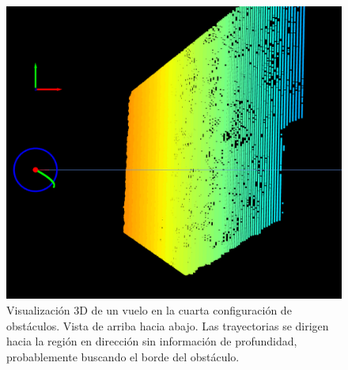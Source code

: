 \begin{figure}[H]
    \centering
    \includegraphics[scale=0.25]{partes/img/depth-wall-2-top.png}
    \caption[Visualización 3D de un vuelo en la cuarta configuración de obstáculos. Vista de arriba hacia abajo. Búsqueda del borde del obstáculo (1).]{Visualización 3D de un vuelo en la cuarta configuración de obstáculos. Vista de arriba hacia abajo. Las trayectorias se dirigen hacia la región en dirección  sin información de profundidad, probablemente buscando el borde del obstáculo.}
    \label{depth-wall-2}
\end{figure}

